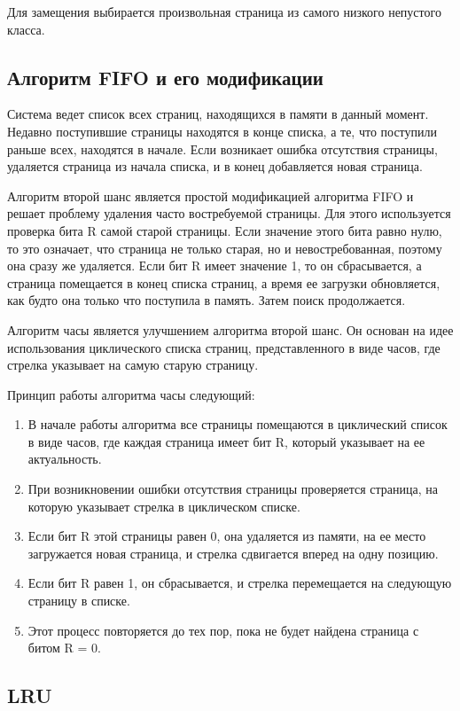 Для замещения выбирается произвольная страница из самого низкого непустого класса.

\subsection{Алгоритм FIFO и его модификации}

Система ведет список всех страниц, находящихся в памяти в данный момент.
Недавно поступившие страницы находятся в конце
списка, а те, что поступили раньше всех, находятся в начале. 
Если возникает ошибка отсутствия страницы, удаляется страница из начала списка, и в конец добавляется новая страница.

Алгоритм второй шанс является простой модификацией алгоритма FIFO и решает проблему удаления часто востребуемой страницы.
Для этого используется проверка бита R самой старой страницы. 
Если значение этого бита равно нулю, то это означает, что страница не только старая, но и невостребованная, поэтому она сразу же удаляется.
Если бит R имеет значение 1, то он сбрасывается, а страница помещается в конец списка страниц, а время ее загрузки обновляется, как будто она только что поступила в память.
Затем поиск продолжается.

Алгоритм часы является улучшением алгоритма второй шанс.
Он основан на идее использования циклического списка страниц, представленного в виде часов, где стрелка указывает на самую старую страницу.

Принцип работы алгоритма часы следующий:
\begin{enumerate}
	\item В начале работы алгоритма все страницы помещаются в циклический список в виде часов, где каждая страница имеет бит R, который указывает на ее актуальность.
	\item При возникновении ошибки отсутствия страницы проверяется страница, на которую указывает стрелка в циклическом списке.
	\item Если бит R этой страницы равен 0, она удаляется из памяти, на ее место загружается новая страница, и стрелка сдвигается вперед на одну позицию.
	\item Если бит R равен 1, он сбрасывается, и стрелка перемещается на следующую страницу в списке.
	\item Этот процесс повторяется до тех пор, пока не будет найдена страница с битом R = 0.
\end{enumerate}

\subsection{LRU}

